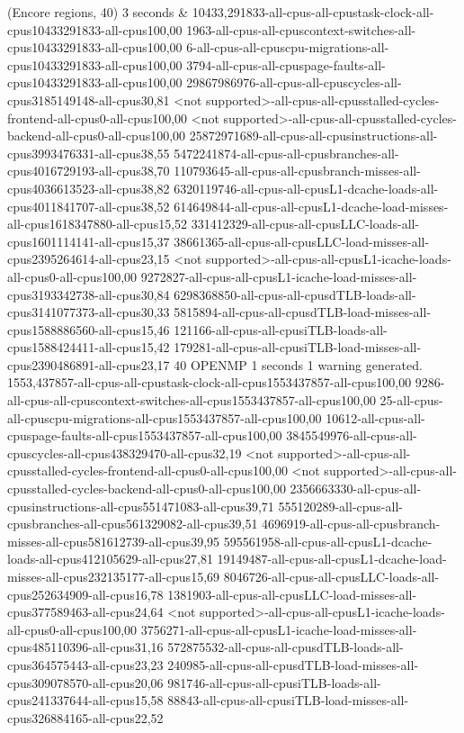 (Encore regions, 40) 3 seconds
&
10433,291833-all-cpus-all-cpustask-clock-all-cpus10433291833-all-cpus100,00
1963-all-cpus-all-cpuscontext-switches-all-cpus10433291833-all-cpus100,00
6-all-cpus-all-cpuscpu-migrations-all-cpus10433291833-all-cpus100,00
3794-all-cpus-all-cpuspage-faults-all-cpus10433291833-all-cpus100,00
29867986976-all-cpus-all-cpuscycles-all-cpus3185149148-all-cpus30,81
<not supported>-all-cpus-all-cpusstalled-cycles-frontend-all-cpus0-all-cpus100,00
<not supported>-all-cpus-all-cpusstalled-cycles-backend-all-cpus0-all-cpus100,00
25872971689-all-cpus-all-cpusinstructions-all-cpus3993476331-all-cpus38,55
5472241874-all-cpus-all-cpusbranches-all-cpus4016729193-all-cpus38,70
110793645-all-cpus-all-cpusbranch-misses-all-cpus4036613523-all-cpus38,82
6320119746-all-cpus-all-cpusL1-dcache-loads-all-cpus4011841707-all-cpus38,52
614649844-all-cpus-all-cpusL1-dcache-load-misses-all-cpus1618347880-all-cpus15,52
331412329-all-cpus-all-cpusLLC-loads-all-cpus1601114141-all-cpus15,37
38661365-all-cpus-all-cpusLLC-load-misses-all-cpus2395264614-all-cpus23,15
<not supported>-all-cpus-all-cpusL1-icache-loads-all-cpus0-all-cpus100,00
9272827-all-cpus-all-cpusL1-icache-load-misses-all-cpus3193342738-all-cpus30,84
6298368850-all-cpus-all-cpusdTLB-loads-all-cpus3141077373-all-cpus30,33
5815894-all-cpus-all-cpusdTLB-load-misses-all-cpus1588886560-all-cpus15,46
121166-all-cpus-all-cpusiTLB-loads-all-cpus1588424411-all-cpus15,42
179281-all-cpus-all-cpusiTLB-load-misses-all-cpus2390486891-all-cpus23,17
40 OPENMP 1 seconds
1 warning generated.
1553,437857-all-cpus-all-cpustask-clock-all-cpus1553437857-all-cpus100,00
9286-all-cpus-all-cpuscontext-switches-all-cpus1553437857-all-cpus100,00
25-all-cpus-all-cpuscpu-migrations-all-cpus1553437857-all-cpus100,00
10612-all-cpus-all-cpuspage-faults-all-cpus1553437857-all-cpus100,00
3845549976-all-cpus-all-cpuscycles-all-cpus438329470-all-cpus32,19
<not supported>-all-cpus-all-cpusstalled-cycles-frontend-all-cpus0-all-cpus100,00
<not supported>-all-cpus-all-cpusstalled-cycles-backend-all-cpus0-all-cpus100,00
2356663330-all-cpus-all-cpusinstructions-all-cpus551471083-all-cpus39,71
555120289-all-cpus-all-cpusbranches-all-cpus561329082-all-cpus39,51
4696919-all-cpus-all-cpusbranch-misses-all-cpus581612739-all-cpus39,95
595561958-all-cpus-all-cpusL1-dcache-loads-all-cpus412105629-all-cpus27,81
19149487-all-cpus-all-cpusL1-dcache-load-misses-all-cpus232135177-all-cpus15,69
8046726-all-cpus-all-cpusLLC-loads-all-cpus252634909-all-cpus16,78
1381903-all-cpus-all-cpusLLC-load-misses-all-cpus377589463-all-cpus24,64
<not supported>-all-cpus-all-cpusL1-icache-loads-all-cpus0-all-cpus100,00
3756271-all-cpus-all-cpusL1-icache-load-misses-all-cpus485110396-all-cpus31,16
572875532-all-cpus-all-cpusdTLB-loads-all-cpus364575443-all-cpus23,23
240985-all-cpus-all-cpusdTLB-load-misses-all-cpus309078570-all-cpus20,06
981746-all-cpus-all-cpusiTLB-loads-all-cpus241337644-all-cpus15,58
88843-all-cpus-all-cpusiTLB-load-misses-all-cpus326884165-all-cpus22,52
